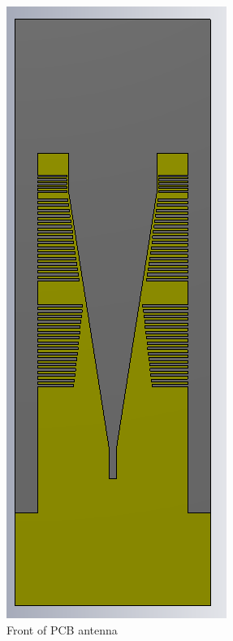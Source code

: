 \begin{figure}[H]
  \centering
  \begin{minipage}[b]{0.5\textwidth}
	\includegraphics[scale = 0.5]{figures/measurement/antenna_front.png}
	\caption{Front of PCB antenna}
    \label{fig:ant_front}
  \end{minipage}
  \hfill
  \begin{minipage}[b]{0.4\textwidth}

\end{minipage}
\end{figure}
